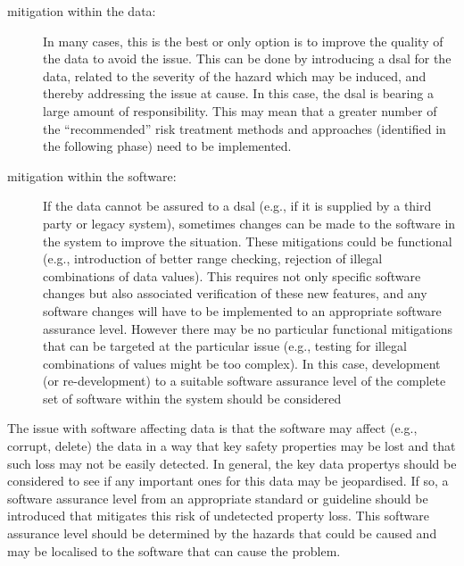 \begin{description}
	\item[\Gls{mitigation} within the data:] In many cases, this is the best or only option is to improve the quality of the data to avoid the issue. This can be done by introducing a \gls{dsal} for the data, related to the severity of the \gls{hazard} which may be induced, and thereby addressing the issue at cause. In this case, the \gls{dsal} is bearing a large amount of responsibility. This may mean that a greater number of the ``recommended'' risk \gls{treatment} methods and approaches (identified in the following phase) need to be implemented.
	\item[\Gls{mitigation} within the software:] If the data cannot be assured to a \gls{dsal} (e.g., if it is supplied by a third party or legacy system), sometimes changes can be made to the software in the system to improve the situation. These \glspl{mitigation} could be functional (e.g., introduction of better range checking, rejection of illegal combinations of data values). This requires not only specific software changes but also associated \gls{verification} of these new features, and any software changes will have to be implemented to an appropriate \gls{software assurance level}. However there may be no particular functional \glspl{mitigation} that can be targeted at the particular issue (e.g., testing for illegal combinations of values might be too complex). In this case, development (or re-development) to a suitable \gls{software assurance level} of the complete set of software within the system should be considered
\end{description}

The issue with software affecting data is that the software may affect (e.g., corrupt, delete) the data in a way that key safety properties may be lost and that such loss may not be easily detected. In general, the key \glspl{data property} should be considered to see if any important ones for this data may be jeopardised. If so, a \gls{software assurance level} from an appropriate standard or guideline should be introduced that mitigates this risk of undetected property loss. This \gls{software assurance level} should be determined by the hazards that could be caused and may be localised to the software that can cause the problem.

